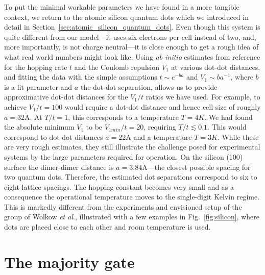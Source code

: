 To put the minimal workable parameters we have found in a more tangible context,
we return to the atomic silicon quantum dots which we introduced in detail in
Section~\ref{sec:atomic_silicon_quantum_dots}. Even though this system is quite
different from our model---it uses six electrons per cell instead of two, and,
more importantly, is not charge neutral---it is close enough to get a rough idea
of what real world numbers might look like. Using \emph{ab initio} estimates
from reference \cite{pitters2011tunnel} for the hopping rate $t$ and the Coulomb
repulsion $V_1$ at various dot-dot distances, and fitting the data with the
simple assumptions $t \sim e^{-b a}$ and $V_1 \sim b a^{-1}$, where $b$ is a fit
parameter and $a$ the dot-dot separation, allows us to provide approximative
dot-dot distances for the $V_1/t$ ratios we have used. For example, to achieve
$V_1/t = 100$ would require a dot-dot distance and hence cell size of roughly $a
= 32 \mathring{\mathrm{A}}$. At $T/t = 1$, this corresponds to a temperature $T
= 4K$. We had found the absolute minimum $V_1$ to be $V_{1min}/t = 20$,
requiring $T/t \lesssim 0.1$. This would correspond to dot-dot distances $a = 22
\mathring{\mathrm{A}}$ and a temperature $T = 3 K$. While these are very rough
estimates, they still illustrate the challenge posed for experimental systems by
the large parameters required for  operation. On the silicon (100)
surface the dimer-dimer distance is $a = 3.84 \mathring{\mathrm{A}}$---the
closest possible spacing for two quantum dots. Therefore, the estimated dot
separations correspond to six to eight lattice spacings. The hopping constant
becomes very small and as a consequence the operational temperature moves to the
single-digit Kelvin regime. This is markedly different from the experiments and
envisioned setup of the group of Wolkow \emph{et al}., illustrated with a few
examples in Fig.~\ref{fig:silicon}, where dots are placed close to each other
and room temperature is used.


\section{The majority gate}

